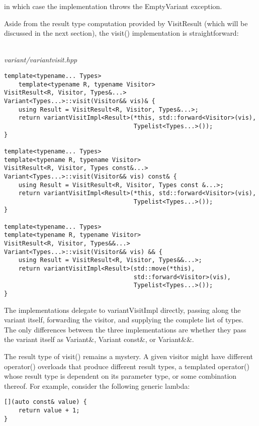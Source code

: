 in which case the implementation throws the EmptyVariant exception.

Aside from the result type computation provided by VisitResult (which will be discussed in the next section), the visit() implementation is straightforward:

\hspace*{\fill} \\ %
\noindent
\textit{variant/variantvisit.hpp}
\begin{lstlisting}[style=styleCXX]
template<typename... Types>
	template<typename R, typename Visitor>
VisitResult<R, Visitor, Types&...>
Variant<Types...>::visit(Visitor&& vis)& {
	using Result = VisitResult<R, Visitor, Types&...>;
	return variantVisitImpl<Result>(*this, std::forward<Visitor>(vis),
									Typelist<Types...>());
}

template<typename... Types>
template<typename R, typename Visitor>
VisitResult<R, Visitor, Types const&...>
Variant<Types...>::visit(Visitor&& vis) const& {
	using Result = VisitResult<R, Visitor, Types const &...>;
	return variantVisitImpl<Result>(*this, std::forward<Visitor>(vis),
									Typelist<Types...>());
}

template<typename... Types>
template<typename R, typename Visitor>
VisitResult<R, Visitor, Types&&...>
Variant<Types...>::visit(Visitor&& vis) && {
	using Result = VisitResult<R, Visitor, Types&&...>;
	return variantVisitImpl<Result>(std::move(*this),
									std::forward<Visitor>(vis),
									Typelist<Types...>());
}
\end{lstlisting}

The implementations delegate to variantVisitImpl directly, passing along the variant itself, forwarding the visitor, and supplying the complete list of types. The only differences between the three implementations are whether they pass the variant itself as Variant\&, Variant const\&, or Variant\&\&.


The result type of visit() remains a mystery. A given visitor might have different operator() overloads that produce different result types, a templated operator() whose result type is dependent on its parameter type, or some combination thereof. For example, consider the following generic lambda:

\begin{lstlisting}[style=styleCXX]
[](auto const& value) {
	return value + 1;
}
\end{lstlisting}

